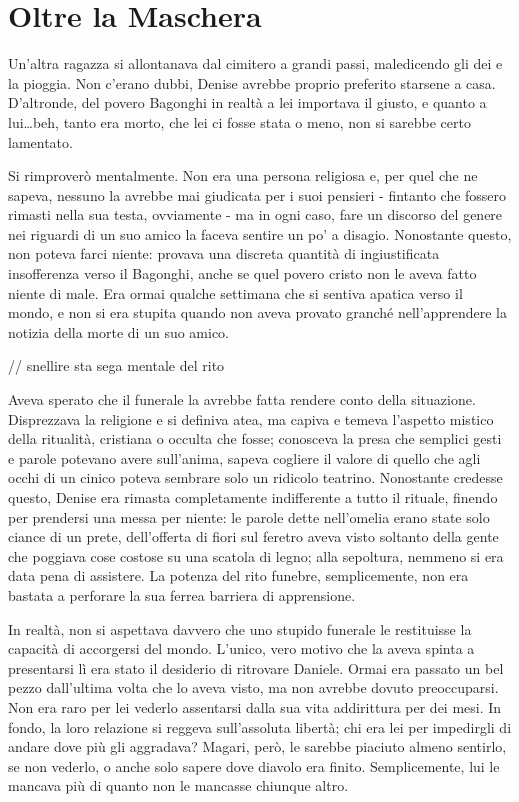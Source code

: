 \chapter{Oltre la Maschera}

Un'altra ragazza si allontanava dal cimitero a grandi passi, maledicendo gli dei e la pioggia. Non c'erano dubbi, Denise avrebbe proprio preferito starsene a casa. D'altronde, del povero Bagonghi in realtà a lei importava il giusto, e quanto a lui\ldots beh, tanto era morto, che lei ci fosse stata o meno, non si sarebbe certo lamentato.

Si rimproverò mentalmente. Non era una persona religiosa e, per quel che ne sapeva, nessuno la avrebbe mai giudicata per i suoi pensieri - fintanto che fossero rimasti nella sua testa, ovviamente - ma in ogni caso, fare un discorso del genere nei riguardi di un suo amico la faceva sentire un po' a disagio. Nonostante questo, non poteva farci niente: provava una discreta quantità di ingiustificata insofferenza verso il Bagonghi, anche se quel povero cristo non le aveva fatto niente di male. Era ormai qualche settimana che si sentiva apatica verso il mondo, e non si era stupita quando non aveva provato granché nell'apprendere la notizia della morte di un suo amico.

// snellire sta sega mentale del rito

Aveva sperato che il funerale la avrebbe fatta rendere conto della situazione. Disprezzava la religione e si definiva atea, ma capiva e temeva l'aspetto mistico della ritualità, cristiana o occulta che fosse; conosceva la presa che semplici gesti e parole potevano avere sull'anima, sapeva cogliere il valore di quello che agli occhi di un cinico poteva sembrare solo un ridicolo teatrino. Nonostante credesse questo, Denise era rimasta completamente indifferente a tutto il rituale, finendo per prendersi una messa per niente: le parole dette nell'omelia erano state solo ciance di un prete, dell'offerta di fiori sul feretro aveva visto soltanto della gente che poggiava cose costose su una scatola di legno; alla sepoltura, nemmeno si era data pena di assistere. La potenza del rito funebre, semplicemente, non era bastata a perforare la sua ferrea barriera di apprensione.

In realtà, non si aspettava davvero che uno stupido funerale le restituisse la capacità di accorgersi del mondo. L'unico, vero motivo che la aveva spinta a presentarsi lì era stato il desiderio di ritrovare Daniele. Ormai era passato un bel pezzo dall'ultima volta che lo aveva visto, ma non avrebbe dovuto preoccuparsi. Non era raro per lei vederlo assentarsi dalla sua vita addirittura per dei mesi. In fondo, la loro relazione si reggeva sull'assoluta libertà; chi era lei per impedirgli di andare dove più gli aggradava? Magari, però, le sarebbe piaciuto almeno sentirlo, se non vederlo, o anche solo sapere dove diavolo era finito. Semplicemente, lui le mancava più di quanto non le mancasse chiunque altro.


